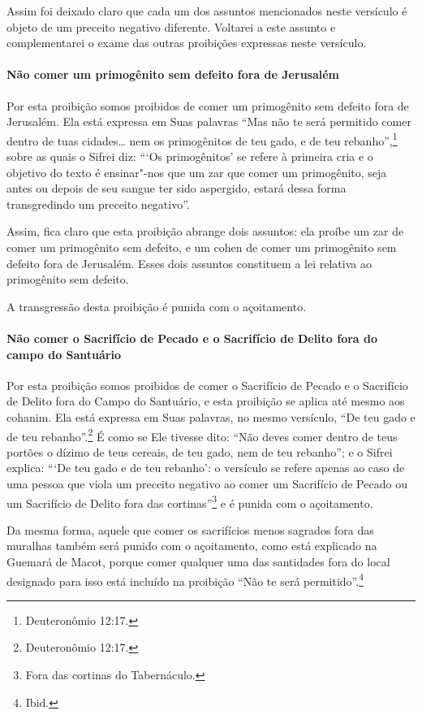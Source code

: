 \begin{multicols}{2}
Assim foi deixado claro que cada um dos assuntos mencionados neste
versículo é objeto de um preceito negativo diferente. Voltarei a este
assunto e complementarei o exame das outras proibições expressas neste
versículo.

\paragraph{Não comer um primogênito sem defeito fora de Jerusalém}

Por esta proibição somos proibidos de comer um primogênito sem defeito
fora de Jerusalém. Ela está expressa em Suas palavras ``Mas não te será
permitido comer dentro de tuas cidades\ldots{} nem os primogênitos de teu
gado, e de teu rebanho'',\footnote{Deuteronômio 12:17.} sobre as quais o Sifrei\starr{}
diz: ```Os primogênitos' se refere à primeira cria e o objetivo do
texto é ensinar"-nos que um zar\starr{} que comer um primogênito, seja antes ou depois de seu sangue ter sido aspergido,
estará dessa forma transgredindo um preceito negativo''.

Assim, fica claro que esta proibição abrange dois assuntos: ela proíbe
um zar\starr{} de comer um primogênito sem defeito, e um cohen\starr{} de comer
um primogênito sem defeito fora de Jerusalém. Esses dois assuntos
constituem a lei relativa ao primogênito sem defeito.

A transgressão desta proibição é punida com o açoitamento.

\paragraph{Não comer o Sacrifício de Pecado e o Sacrifício de Delito fora do campo do
Santuário}

Por esta proibição somos proibidos de comer o Sacrifício de Pecado e o
Sacrifício de Delito fora do Campo do Santuário, e esta proibição se
aplica até mesmo aos cohanim\starr. Ela está expressa em Suas palavras, no
mesmo versículo, ``De teu gado e de teu rebanho''.\footnote{Deuteronômio 12:17.}
É como se Ele
tivesse dito: ``Não deves comer dentro de teus portões o dízimo de teus
cereais, de teu gado, nem de teu rebanho''; e o Sifrei\starr{} explica: ```De
teu gado e de teu rebanho': o versículo se refere apenas ao caso de uma
pessoa que viola um preceito negativo ao comer um Sacrifício de Pecado
ou um Sacrifício de Delito fora das cortinas''\footnote{Fora das cortinas do Tabernáculo.} e é punida com o açoitamento.

Da mesma forma, aquele que comer os sacrifícios menos sagrados fora das
muralhas também será punido com o açoitamento, como está explicado na
Guemará\starr{} de Macot\starr, porque comer qualquer uma das santidades fora do local
designado para isso está incluído na proibição ``Não te será permitido''.\footnote{Ibid.}


\end{multicols}
